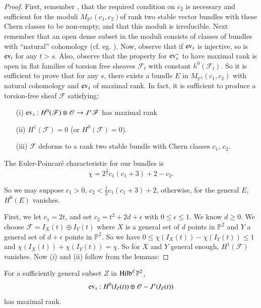 \begin{proof}
First, remember \cite{chap6-Schw}, \cite{chap6-Ma2} that the required
condition on $c_{2}$ is necessary and sufficient for the moduli
$M_{\mathbb{P}^{2}}(c_{1},c_{2})$\pageoriginale of rank two stable
vector bundles with these Chern classes to be non-empty, and that this
moduli is irreducible. Next remember that an open dense subset in the
moduli consists of classes of bundles with ``natural'' cohomology
(cf. eg. \cite{chap6-Bru}). Now, observe that if $\operatorname{ev}_{s}$ is
injective, so is $\operatorname{ev}_{t}$ for any $t>s$. Also, observe that the
property for $\operatorname{ev}^{-}_{s}$ to have maximal rank is open in flat
families of torsion free sheaves $\mathscr{F}_{t}$ with constant
$h^{0}(\mathscr{F}_{t})$. So it is sufficient to prove that for any
$s$, there exists a bundle $E$ in $M_{\mathbb{P}^{2}}(c_{1},c_{2})$
with natural cohomology and $\operatorname{ev}_{s}$ of maximal rank. In fact, it is
sufficient to produce a torsion-free sheaf $\mathscr{F}$ satisfying:
\begin{itemize}
\item[(i)] $\operatorname{ev}_{s}:H^{0}(\mathscr{F})\otimes \mathscr{O}\to
J^{s}\mathscr{F}$ has maximal rank

\item[(ii)] $H^{1}(\mathscr{F})=0$ (or $H^{0}(\mathscr{F})=0$).

\item[(iii)] $\mathscr{F}$ deforms to a rank two stable bundle with
Chern classes $c_{1}$, $c_{2}$. 
\end{itemize}
The Euler-Poincar\'e characteristic for our bundles is
$$
\chi =2^{\frac{1}{2}}c_{1}(c_{1}+3)+2-c_{2}.
$$

So we may suppose $c_{1}>0$, $c_{2}<\frac{1}{2}c_{1}(c_{1}+3)+2$,
otherwise, for the general $E$, $H^{0}(E)$ vanishes.

First, we let $c_{1}=2t$, and set $c_{2}=t^{2}+2d+\epsilon$ with
$0\leq \epsilon\leq 1$. We know $d\geq 0$. We choose
$\mathscr{F}=I_{X}(t)\oplus I_{Y}(t)$ where $X$ is a general set of
$d$ points in $\mathbb{P}^{2}$ and $Y$ a general set of $d+\epsilon$
points in $\mathbb{P}^{2}$. So we have
$0\leq \chi(I_{X}(t))-\chi(I_{Y}(t))\leq 1$ and
$\chi(I_{X}(t))+\chi(I_{Y}(t))=\chi$. So for $X$ and $Y$ general
enough, $H^{1}(\mathscr{F})$ vanishes. Now (i) and (ii) follow from
the lemmas:
\end{proof}

\begin{lemma}\label{chap6-lem1}
For a sufficiently general subset $Z$ in $\operatorname{Hilb}^{d}\mathbb{P}^{2}$,
$$
\operatorname{ev}_{s}:H^{0}(I_{Z}(t))\otimes \mathscr{O}-J^{s}(I_{Z}(t))
$$ 
has maximal rank. 
\end{lemma}

